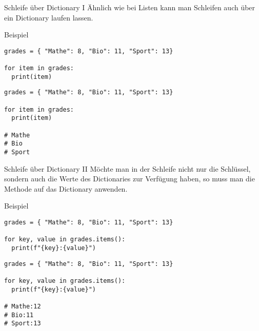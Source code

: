 \begin{fragile}
\begin{block}{Schleife über Dictionary I}
\vspace{2pt}
Ähnlich wie bei Listen kann man Schleifen auch über ein Dictionary laufen lassen.  
\end{block}
\vspace{12pt}
\pause 

\begin{exampleblock}{Beispiel}
\vspace{2pt}
\begin{overprint}
\begin{verbatim}
grades = { "Mathe": 8, "Bio": 11, "Sport": 13}

for item in grades:
  print(item)
\end{verbatim}
\begin{verbatim}
grades = { "Mathe": 8, "Bio": 11, "Sport": 13}

for item in grades:
  print(item)

# Mathe
# Bio
# Sport
\end{verbatim}
\end{overprint}
\end{exampleblock}
\end{fragile}

\begin{fragile}
\begin{block}{Schleife über Dictionary II}
\vspace{2pt}
Möchte man in der Schleife nicht nur die Schlüssel, sondern auch die Werte des Dictionaries zur Verfügung haben, so muss man die Methode  auf das Dictionary anwenden.   
\end{block}
\vspace{12pt}
\pause 


\begin{exampleblock}{Beispiel}
\vspace{2pt}
\begin{overprint}
\begin{verbatim}
grades = { "Mathe": 8, "Bio": 11, "Sport": 13}

for key, value in grades.items():
  print(f"{key}:{value}")
\end{verbatim}
\begin{verbatim}
grades = { "Mathe": 8, "Bio": 11, "Sport": 13}

for key, value in grades.items():
  print(f"{key}:{value}")

# Mathe:12
# Bio:11
# Sport:13
\end{verbatim}
\end{overprint}
\end{exampleblock}
\end{fragile}

